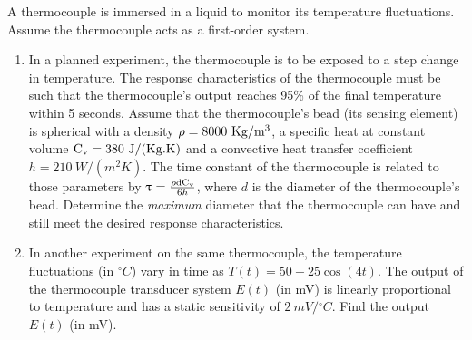 \documentclass[a4paper,11pt]{book}
\begin{document}
\begin{question}[subtitle=Midterm 2017]
A thermocouple is immersed in a liquid to monitor its temperature fluctuations. Assume the thermocouple acts as a first-order system.
\begin{enumerate}
\item In a planned experiment, the thermocouple is to be exposed to a step change in temperature. The
response characteristics of the thermocouple must be such that the thermocouple’s output reaches 95\% of the final temperature within 5 seconds. Assume that the thermocouple’s bead (its sensing element) is spherical with  a density ${\rm \rho = 8000 ~Kg/m^3}$, a specific heat at constant volume ${\rm C_v = 380 ~J/(Kg.K)}$ and a convective heat transfer coefficient $h = 210 ~W/(m^2 K)$. The time constant of the thermocouple is related to those parameters by $\uptau = \frac{\rm \rho d C_v}{6h}$, where $d$ is the diameter of the thermocouple's bead. Determine the \emph{maximum} diameter that the
thermocouple can have and still meet the desired response characteristics.
\item In another experiment on the same thermocouple, the temperature fluctuations (in ${}^\circ C$) vary in time as $T(t) = 50 + 25\cos(4t)$. The output of the thermocouple transducer system $E(t)$ (in mV) is linearly proportional to temperature and has a static sensitivity of $2~ mV/{}^\circ C$. Find the output $E(t)$ (in mV).
\end{enumerate}

\examspace*{30em}

\end{question}
\begin{solution}
\end{solution}
\end{document}
